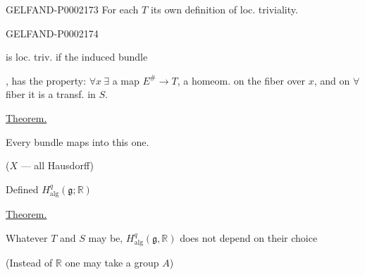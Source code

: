 \begin{GelfandAdjacentEvidence}{GELFAND-P000217}{3}
For each $T$ its own definition of loc. triviality.







\end{GelfandAdjacentEvidence}
\begin{GelfandAdjacentEvidence}{GELFAND-P000217}{4}

is loc. triv. if the induced bundle







, has the property:
$\forall x\ \exists$ a map $E^{\#}\longrightarrow T$, a homeom. on the fiber over $x$, and
on $\forall$ fiber it is a transf. in $S$.




\end{GelfandAdjacentEvidence}
\underline{Theorem.}



Every bundle maps into this one.



($X$ --- all Hausdorff)



Defined $H^q_{\mathrm{alg}}(\mathfrak g;\mathbb R)$



\underline{Theorem.}



Whatever $T$ and $S$ may be, $H^q_{\mathrm{alg}}(\mathfrak g,\mathbb R)$
does not depend on their choice



(Instead of $\mathbb R$ one may take a group $A$)



